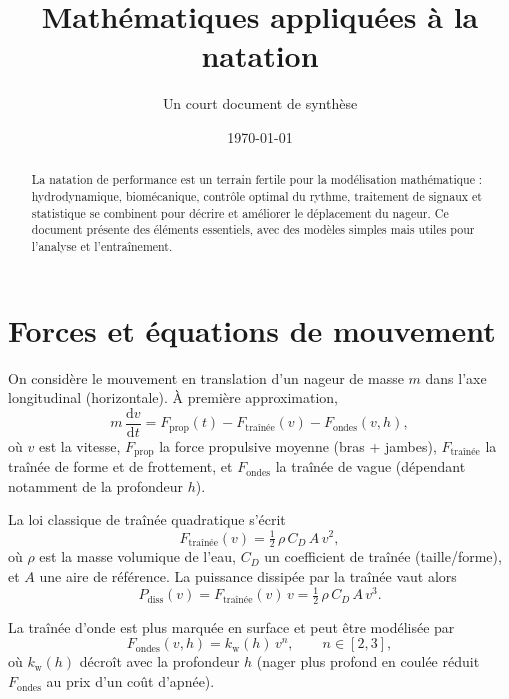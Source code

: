 \documentclass[11pt,a4paper]{article}
\title{\textbf{Mathématiques appliquées à la natation}}
\author{Un court document de synthèse}
\date{\today}
\newcommand{\dd}{\mathrm{d}}
\begin{document}
\maketitle

\begin{abstract}
La natation de performance est un terrain fertile pour la modélisation mathématique : hydrodynamique, biomécanique, contrôle optimal du rythme, traitement de signaux et statistique se combinent pour décrire et améliorer le déplacement du nageur. Ce document présente des éléments essentiels, avec des modèles simples mais utiles pour l'analyse et l'entraînement.
\end{abstract}

\section{Forces et équations de mouvement}
On considère le mouvement en translation d'un nageur de masse $m$ dans l'axe longitudinal (horizontale). À première approximation,
\begin{equation}
 m\,\frac{\dd v}{\dd t} = F_{\mathrm{prop}}(t) - F_{\mathrm{traînée}}(v) - F_{\mathrm{ondes}}(v,h),
 \label{eq:newton}
\end{equation}
où $v$ est la vitesse, $F_{\mathrm{prop}}$ la force propulsive moyenne (bras + jambes), $F_{\mathrm{traînée}}$ la traînée de forme et de frottement, et $F_{\mathrm{ondes}}$ la traînée de vague (dépendant notamment de la profondeur $h$).

La loi classique de traînée quadratique s'écrit
\begin{equation}
 F_{\mathrm{traînée}}(v) = \tfrac{1}{2}\,\rho\,C_D\,A\,v^2,
 \end{equation}
où $\rho$ est la masse volumique de l'eau, $C_D$ un coefficient de traînée (taille/forme), et $A$ une aire de référence. La puissance dissipée par la traînée vaut alors
\begin{equation}
 P_{\mathrm{diss}}(v) = F_{\mathrm{traînée}}(v)\,v = \tfrac{1}{2}\,\rho\,C_D\,A\,v^3.
 \end{equation}

La traînée d'onde est plus marquée en surface et peut être modélisée par
\begin{equation}
 F_{\mathrm{ondes}}(v,h) = k_\mathrm{w}(h)\,v^n, \qquad n\in[2,3],
 \end{equation}
où $k_\mathrm{w}(h)$ décroît avec la profondeur $h$ (nager plus profond en coulée réduit $F_{\mathrm{ondes}}$ au prix d'un coût d'apnée).
\end{document}
